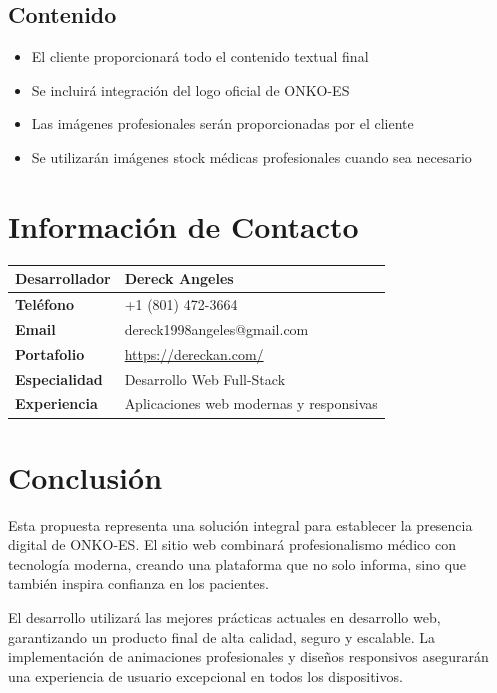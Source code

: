 \documentclass[12pt,a4paper]{article}
\begin{document}
\subsection{Contenido}
\begin{itemize}
    \item El cliente proporcionará todo el contenido textual final
    \item Se incluirá integración del logo oficial de ONKO-ES
    \item Las imágenes profesionales serán proporcionadas por el cliente
    \item Se utilizarán imágenes stock médicas profesionales cuando sea necesario
\end{itemize}

\section{Información de Contacto}

\begin{center}
\begin{tabularx}{0.8\textwidth}{|l|X|}
\hline
\textbf{Desarrollador} & \textbf{Dereck Angeles} \\
\hline
\textbf{Teléfono} & +1 (801) 472-3664 \\
\hline
\textbf{Email} & dereck1998angeles@gmail.com \\
\hline
\textbf{Portafolio} & \url{https://dereckan.com/} \\
\hline
\textbf{Especialidad} & Desarrollo Web Full-Stack \\
\hline
\textbf{Experiencia} & Aplicaciones web modernas y responsivas \\
\hline
\end{tabularx}
\end{center}

\section{Conclusión}

Esta propuesta representa una solución integral para establecer la presencia digital de ONKO-ES. El sitio web combinará profesionalismo médico con tecnología moderna, creando una plataforma que no solo informa, sino que también inspira confianza en los pacientes.

El desarrollo utilizará las mejores prácticas actuales en desarrollo web, garantizando un producto final de alta calidad, seguro y escalable. La implementación de animaciones profesionales y diseños responsivos asegurarán una experiencia de usuario excepcional en todos los dispositivos.
\end{document}
